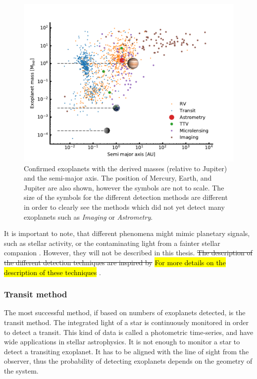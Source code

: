 \begin{figure}[htpb!]
    \centering
    \includegraphics[width=1.0\linewidth]{figures/exoplanetDetectionType.pdf}
    \caption{Confirmed exoplanets with the derived masses (relative to Jupiter) and the semi-major
             axis. The position of Mercury, Earth, and Jupiter are also shown, however the symbols
             are not to scale. The size of the symbols for the different detection methods are
             different in order to clearly see the methods which did not yet detect many exoplanets
             such as \emph{Imaging} or \emph{Astrometry}.}
    \label{fig:detectionTypes}
\end{figure}

It is important to note, that different phenomena might mimic planetary signals, such as stellar
activity, or the contaminating light from a fainter stellar companion \citep[see
e.g.][]{Queloz2001,Oshagh2013,Oshagh2014}. However, they will not be described in this thesis.
\st{The description of the different detection techniques are inspired by} \hl{For more details on
the description of these techniques} \citet[see e.g][]{Seager2010}.


\subsubsection{Transit method}
\label{sec:transitMethod}

The most successful method, if based on numbers of exoplanets detected, is the transit method. The
integrated light of a star is continuously monitored in order to detect a transit. This kind of data
is called a photometric time-series, and have wide applications in stellar astrophysics. It is not
enough to monitor a star to detect a transiting exoplanet. It has to be aligned with the line of
sight from the observer, thus the probability of detecting exoplanets depends on the geometry of the
system.

